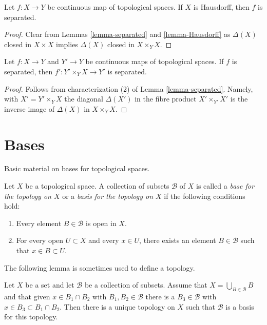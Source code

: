 \begin{lemma}
\label{lemma-from-hausdorff}
Let $f : X \to Y$ be continuous map of topological spaces.
If $X$ is Hausdorff, then $f$ is separated.
\end{lemma}

\begin{proof}
Clear from Lemmas \ref{lemma-separated} and \ref{lemma-Hausdorff}
as $\Delta(X)$ closed in $X \times X$ implies $\Delta(X)$ closed
in $X \times_Y X$.
\end{proof}

\begin{lemma}
\label{lemma-base-change-separated}
Let $f : X \to Y$ and $Y' \to Y$ be continuous maps of topological spaces.
If $f$ is separated, then $f' : Y' \times_Y X \to Y'$ is separated.
\end{lemma}

\begin{proof}
Follows from characterization (2) of Lemma \ref{lemma-separated}.
Namely, with $X' = Y' \times_Y X$ the diagonal $\Delta(X')$
in the fibre product $X' \times_{Y'} X'$ is the inverse image of
$\Delta(X)$ in $X \times_Y X$.
\end{proof}




\section{Bases}
\label{section-bases}

\noindent
Basic material on bases for topological spaces.

\begin{definition}
\label{definition-base}
Let $X$ be a topological space. A collection of subsets $\mathcal{B}$ of $X$
is called a {\it base for the topology on $X$} or a {\it basis for the
topology on $X$} if the following conditions hold:
\begin{enumerate}
\item Every element $B \in \mathcal{B}$ is open in $X$.
\item For every open $U \subset X$ and every $x \in U$,
there exists an element $B \in \mathcal{B}$ such that
$x \in B \subset U$.
\end{enumerate}
\end{definition}

\noindent
The following lemma is sometimes used to define a topology.

\begin{lemma}
\label{lemma-make-base}
Let $X$ be a set and let $\mathcal{B}$ be a collection of subsets.
Assume that $X = \bigcup_{B \in \mathcal{B}} B$ and that given
$x \in B_1 \cap B_2$ with $B_1, B_2 \in \mathcal{B}$ there is a
$B_3 \in \mathcal{B}$ with $x \in B_3 \subset B_1 \cap B_2$.
Then there is a unique topology on $X$ such that $\mathcal{B}$
is a basis for this topology.
\end{lemma}

